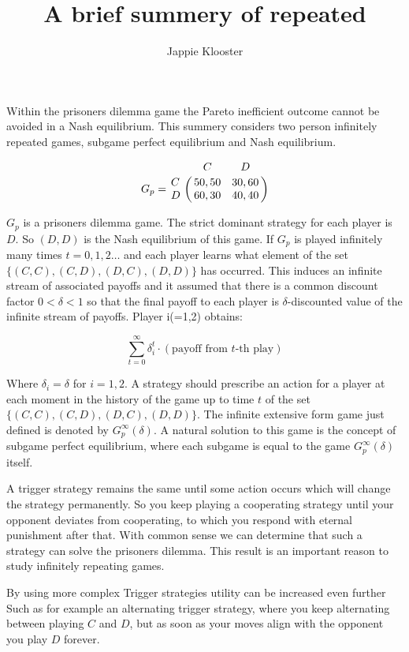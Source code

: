 \documentclass{article}
\begin{document}
\author{Jappie Klooster}
\title{A brief summery of repeated}

\maketitle

Within the prisoners dilemma game the Pareto inefficient outcome
cannot be avoided in a Nash equilibrium. This summery considers
two person infinitely repeated games, subgame perfect
equilibrium and Nash equilibrium.

\[G_p= 
	\bordermatrix{~ & C & D \cr
                  C & 50,50 & 30,60 \cr
                  D & 60,30 & 40,40 \cr}
\]

$G_p$ is a prisoners dilemma game. The strict dominant strategy
for each player is $D$. So $(D,D)$ is the Nash equilibrium of this game.
If $G_p$ is played infinitely many times $t=0,1,2\dots$ and each player
learns what element of the set $\{(C,C),(C,D), (D,C),(D,D)\}$ has occurred.
This induces an infinite stream of associated payoffs and it assumed that
there is a common discount factor $0 < \delta < 1$ so that the final payoff
to each player is $\delta$-discounted value of the infinite stream of
payoffs. Player i(=1,2) obtains:

\[\sum^\infty_{t=0}\delta^t_i\cdot(\text{payoff from $t$-th play})\]

Where $\delta_i=\delta$ for $i=1,2$. A strategy should prescribe an
action for a player at each moment in the history of the game up
to time $t$ of the set $\{(C,C),(C,D),(D,C),(D,D)\}$. The infinite
extensive form game just defined is denoted by $G^\infty_p(\delta)$.
A natural solution to this game is the concept of subgame perfect
equilibrium, where each subgame is equal to the game $G^\infty_p(\delta)$
itself.

A trigger strategy remains the same until some action occurs which
will change the strategy permanently. So you keep playing a cooperating
strategy until your opponent deviates from cooperating, to which you respond
with eternal punishment after that. With common sense we can determine that
such a strategy can solve the prisoners dilemma. This result is an important
reason to study infinitely repeating games.

By using more complex Trigger strategies utility can be increased even further
Such as for example an alternating trigger strategy, where you keep alternating
between playing $C$ and $D$, but as soon as your moves align with the opponent
you play $D$ forever.
\end{document}
